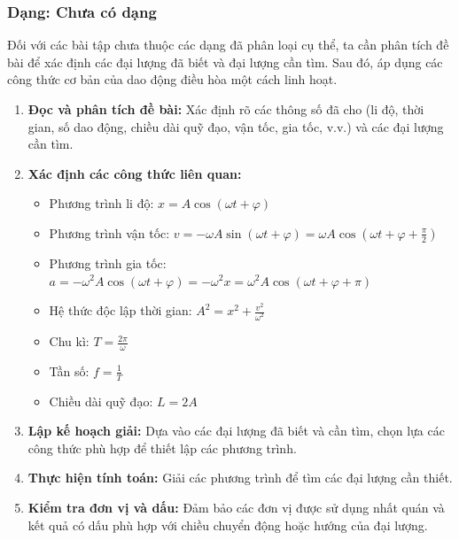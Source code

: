 \subsubsection{Dạng: Chưa có dạng}
\begin{phuongphap}
Đối với các bài tập chưa thuộc các dạng đã phân loại cụ thể, ta cần phân tích đề bài để xác định các đại lượng đã biết và đại lượng cần tìm. Sau đó, áp dụng các công thức cơ bản của dao động điều hòa một cách linh hoạt.
\begin{enumerate}
    \item \textbf{Đọc và phân tích đề bài:} Xác định rõ các thông số đã cho (li độ, thời gian, số dao động, chiều dài quỹ đạo, vận tốc, gia tốc, v.v.) và các đại lượng cần tìm.
    \item \textbf{Xác định các công thức liên quan:}
    \begin{itemize}
        \item Phương trình li độ: $x = A\cos(\omega t + \varphi)$
        \item Phương trình vận tốc: $v = -\omega A\sin(\omega t + \varphi) = \omega A\cos(\omega t + \varphi + \frac{\pi}{2})$
        \item Phương trình gia tốc: $a = -\omega^2 A\cos(\omega t + \varphi) = -\omega^2 x = \omega^2 A\cos(\omega t + \varphi + \pi)$
        \item Hệ thức độc lập thời gian: $A^2 = x^2 + \frac{v^2}{\omega^2}$
        \item Chu kì: $T = \frac{2\pi}{\omega}$
        \item Tần số: $f = \frac{1}{T}$
        \item Chiều dài quỹ đạo: $L = 2A$
    \end{itemize}
    \item \textbf{Lập kế hoạch giải:} Dựa vào các đại lượng đã biết và cần tìm, chọn lựa các công thức phù hợp để thiết lập các phương trình.
    \item \textbf{Thực hiện tính toán:} Giải các phương trình để tìm các đại lượng cần thiết.
    \item \textbf{Kiểm tra đơn vị và dấu:} Đảm bảo các đơn vị được sử dụng nhất quán và kết quả có dấu phù hợp với chiều chuyển động hoặc hướng của đại lượng.
\end{enumerate}
\end{phuongphap}
